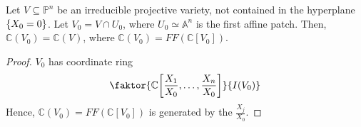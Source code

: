 \begin{corollary}
    Let \( V \subseteq \mathbb P^n \) be an irreducible projective variety, not contained in the hyperplane \( \qty{X_0 = 0} \).
    Let \( V_0 = V \cap U_0 \), where \( U_0 \simeq \mathbb A^n \) is the first affine patch.
    Then, \( \mathbb C(V_0) = \mathbb C(V) \), where \( \mathbb C(V_0) = FF(\mathbb C[V_0]) \).
\end{corollary}
\begin{proof}
    \( V_0 \) has coordinate ring
    \[ \faktor{\mathbb C\qty[\frac{X_1}{X_0}, \dots, \frac{X_n}{X_0}]}{I(V_0)} \]
    Hence, \( \mathbb C(V_0) = FF(\mathbb C[V_0]) \) is generated by the \( \frac{X_j}{X_0} \).
\end{proof}

